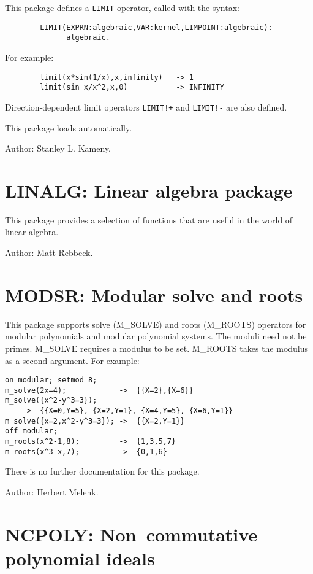 This package defines a {\tt LIMIT} operator, called with the syntax:
\begin{verbatim}
        LIMIT(EXPRN:algebraic,VAR:kernel,LIMPOINT:algebraic):
              algebraic.
\end{verbatim}
For example:
\begin{verbatim}
        limit(x*sin(1/x),x,infinity)   -> 1
        limit(sin x/x^2,x,0)           -> INFINITY
\end{verbatim}
Direction-dependent limit operators {\tt LIMIT!+} and {\tt LIMIT!-} are
also defined.

This package loads automatically.

Author: Stanley L. Kameny.

\section{LINALG: Linear algebra package} 

This package provides a selection of functions that are useful
in the world of linear algebra.

Author: Matt Rebbeck.

\section{MODSR: Modular solve and roots} 

This package supports solve (M\_SOLVE) and roots (M\_ROOTS) operators for
modular polynomials and modular polynomial systems.  The moduli need not
be primes. M\_SOLVE requires a modulus to be set.  M\_ROOTS takes the
modulus as a second argument. For example:

\begin{verbatim}
on modular; setmod 8;
m_solve(2x=4);            ->  {{X=2},{X=6}}
m_solve({x^2-y^3=3});
    ->  {{X=0,Y=5}, {X=2,Y=1}, {X=4,Y=5}, {X=6,Y=1}}
m_solve({x=2,x^2-y^3=3}); ->  {{X=2,Y=1}}
off modular;
m_roots(x^2-1,8);         ->  {1,3,5,7}
m_roots(x^3-x,7);         ->  {0,1,6}
\end{verbatim}

There is no further documentation for this package.

Author: Herbert Melenk.

\section{NCPOLY: Non--commutative polynomial ideals}

